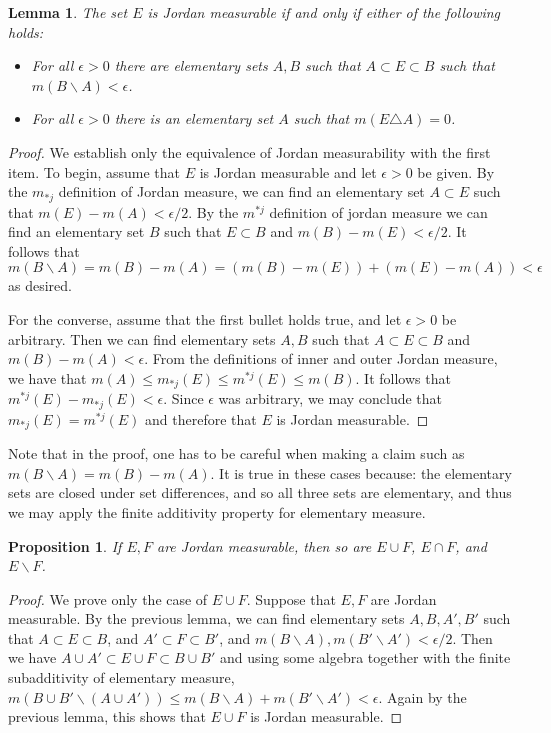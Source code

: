 \documentclass[11pt,oneside]{amsbook}
\renewcommand{\setminus}{\smallsetminus}
\theoremstyle{definition}
\theoremstyle{plain}
\newtheorem{lem}[thm]{Lemma}
\newtheorem{prop}[thm]{Proposition}
\theoremstyle{definition}
\theoremstyle{remark}
\numberwithin{equation}{section}
\numberwithin{figure}{section}
\begin{document}
\begin{lem}
  \label{lem:jordan-equiv}
  The set $E$ is Jordan measurable if and only if either of the following holds:
  \begin{itemize}
  \item For all $\epsilon>0$ there are elementary sets $A,B$ such that $A\subset E\subset B$ such that $m(B\setminus A)<\epsilon$.
  \item For all $\epsilon>0$ there is an elementary set $A$ such that $m(E\triangle A)=0$.
  \end{itemize}
\end{lem}

\begin{proof}
  We establish only the equivalence of Jordan measurability with the first item. To begin, assume that $E$ is Jordan measurable and let $\epsilon>0$ be given. By the $m_{*j}$ definition of Jordan measure, we can find an elementary set $A\subset E$ such that $m(E)-m(A)<\epsilon/2$. By the $m^{*j}$ definition of jordan measure we can find an elementary set $B$ such that $E\subset B$ and $m(B)-m(E)<\epsilon/2$. It follows that 
\[m(B\setminus A)=m(B)-m(A)=(m(B)-m(E))+(m(E)-m(A))<\epsilon
\]
as desired.

  For the converse, assume that the first bullet holds true, and let $\epsilon>0$ be arbitrary. Then we can find elementary sets $A,B$ such that $A\subset E\subset B$ and $m(B)-m(A)<\epsilon$. From the definitions of inner and outer Jordan measure, we have that $m(A)\leq m_{*j}(E)\leq m^{*j}(E)\leq m(B)$. It follows that $m^{*j}(E)-m_{*j}(E)<\epsilon$. Since $\epsilon$ was arbitrary, we may conclude that $m_{*j}(E)=m^{*j}(E)$ and therefore that $E$ is Jordan measurable.
\end{proof}

Note that in the proof, one has to be careful when making a claim such as $m(B\setminus A)=m(B)-m(A)$. It is true in these cases because: the elementary sets are closed under set differences, and so all three sets are elementary, and thus we may apply the finite additivity property for elementary measure.

\begin{prop}
  \label{prop:jordan-closure}
  If $E,F$ are Jordan measurable, then so are $E\cup F$, $E\cap F$, and $E\setminus F$.
\end{prop}

\begin{proof}
  We prove only the case of $E\cup F$. Suppose that $E,F$ are Jordan measurable. By the previous lemma, we can find elementary sets $A,B,A',B'$ such that $A\subset E\subset B$, and $A'\subset F\subset B'$, and $m(B\setminus A),m(B'\setminus A')<\epsilon/2$. Then we have $A\cup A'\subset E\cup F\subset B\cup B'$ and using some algebra together with the finite subadditivity of elementary measure, $m(B\cup B'\setminus(A\cup A'))\leq m(B\setminus A)+m(B'\setminus A')<\epsilon$. Again by the previous lemma, this shows that $E\cup F$ is Jordan measurable.
\end{proof}
\end{document}
